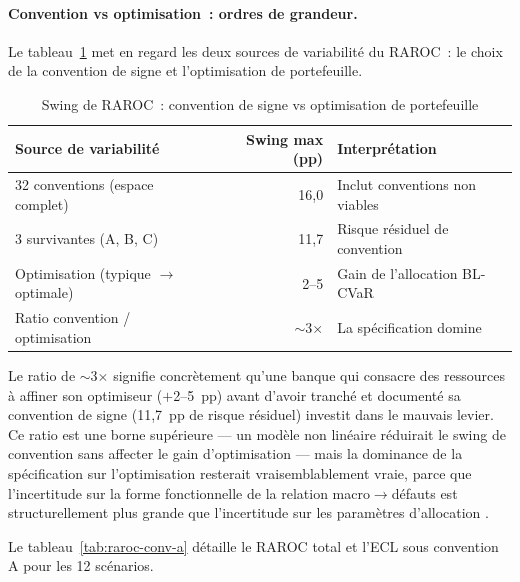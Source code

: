 \documentclass[10pt, a4paper, oneside]{report}
\theoremstyle{definition}
\begin{document}
\paragraph{Convention vs optimisation~: ordres de grandeur.} Le tableau~\ref{tab:swing-comparatif} met en regard les deux sources de variabilité du RAROC~: le choix de la convention de signe et l'optimisation de portefeuille.

\begin{table}[htbp]
\centering
\caption{Swing de RAROC~: convention de signe vs optimisation de portefeuille}
\label{tab:swing-comparatif}
\small
\begin{tabular}{lrl}
\toprule
Source de variabilité & Swing max (pp) & Interprétation \\
\midrule
32 conventions (espace complet) & 16{,}0 & Inclut conventions non viables \\
3 survivantes (A, B, C) & 11{,}7 & Risque résiduel de convention \\
Optimisation (typique $\to$ optimale) & 2--5 & Gain de l'allocation BL-CVaR \\
\midrule
Ratio convention / optimisation & $\sim$3$\times$ & La spécification domine \\
\bottomrule
\end{tabular}
\end{table}

\noindent Le ratio de $\sim$3$\times$ signifie concrètement qu'une banque qui consacre des ressources à affiner son optimiseur ($+$2--5~pp) avant d'avoir tranché et documenté sa convention de signe (11{,}7~pp de risque résiduel) investit dans le mauvais levier. Ce ratio est une borne supérieure --- un modèle non linéaire réduirait le swing de convention sans affecter le gain d'optimisation --- mais la dominance de la spécification sur l'optimisation resterait vraisemblablement vraie, parce que l'incertitude sur la forme fonctionnelle de la relation macro$\to$défauts est structurellement plus grande que l'incertitude sur les paramètres d'allocation \citep{mcneil_frey_embrechts2015}.

Le tableau~\ref{tab:raroc-conv-a} détaille le RAROC total et l'ECL sous convention A pour les 12 scénarios.
\end{document}
